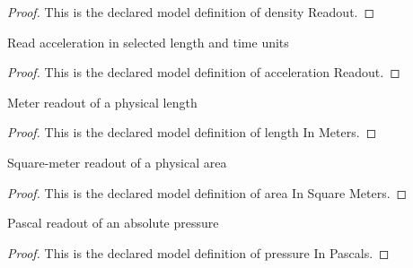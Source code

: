 \begin{proof}
  This is the declared model definition of density Readout.
\end{proof}
\begin{definition}
  \label{def:physics:phyx-mini-0385:phyxminiproblems-problemphyxmini0385-accelerationreadout}
  Read acceleration in selected length and time units
\end{definition}
\begin{proof}
  This is the declared model definition of acceleration Readout.
\end{proof}
\begin{definition}
  \label{def:physics:phyx-mini-0385:phyxminiproblems-problemphyxmini0385-lengthinmeters}
  Meter readout of a physical length
\end{definition}
\begin{proof}
  This is the declared model definition of length In Meters.
\end{proof}
\begin{definition}
  \label{def:physics:phyx-mini-0385:phyxminiproblems-problemphyxmini0385-areainsquaremeters}
  Square-meter readout of a physical area
\end{definition}
\begin{proof}
  This is the declared model definition of area In Square Meters.
\end{proof}
\begin{definition}
  \label{def:physics:phyx-mini-0385:phyxminiproblems-problemphyxmini0385-pressureinpascals}
  Pascal readout of an absolute pressure
\end{definition}
\begin{proof}
  This is the declared model definition of pressure In Pascals.
\end{proof}
